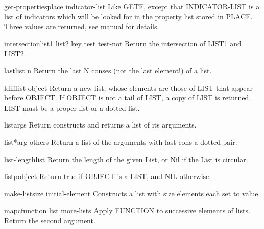 \begin{function}{get-properties}{place indicator-list}{}{}
  Like GETF, except that INDICATOR-LIST is a list of indicators which will
  be looked for in the property list stored in PLACE. Three values are
  returned, see manual for details.
\end{function}

\begin{function}{intersection}{list1 list2 \key key test test-not}{}{}
  Return the intersection of LIST1 and LIST2.
\end{function}

\begin{function}{last}{list \op n}{}{}
  Return the last N conses (not the last element!) of a list.
\end{function}

\begin{function}{ldiff}{list object}{}{}
  Return a new list, whose elements are those of LIST that appear before
   OBJECT. If OBJECT is not a tail of LIST, a copy of LIST is returned.
   LIST must be a proper list or a dotted list.
\end{function}

\begin{function}{list}{\rest args}{}{}
  Return constructs and returns a list of its arguments.
\end{function}

\begin{function}{list*}{arg \rest others}{}{}
  Return a list of the arguments with last cons a dotted pair.
\end{function}

\begin{function}{list-length}{list}{}{}
  Return the length of the given List, or Nil if the List is circular.
\end{function}

\begin{function}{listp}{object}{}{}
  Return true if OBJECT is a LIST, and NIL otherwise.
\end{function}

\begin{function}{make-list}{size \key initial-element}{}{}
  Constructs a list with size elements each set to value
\end{function}

\begin{function}{mapc}{function list \rest more-lists}{}{}
  Apply FUNCTION to successive elements of lists. Return the second argument.
\end{function}

